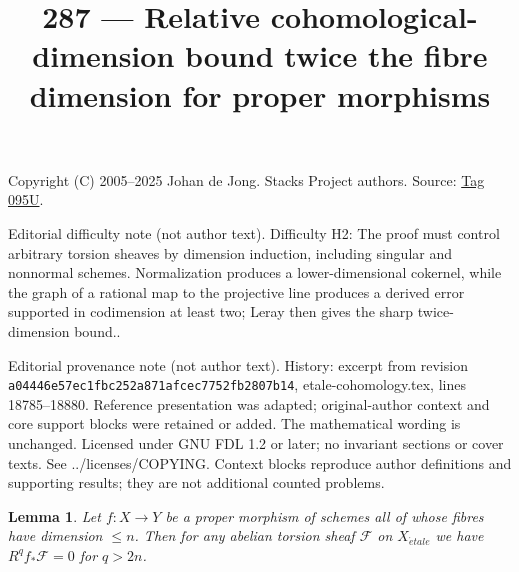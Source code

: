 \documentclass{amsart}
\theoremstyle{plain}
\newtheorem{lemma}[subsection]{Lemma}
\theoremstyle{definition}
\theoremstyle{remark}
\numberwithin{equation}{subsection}
\def\etale{{\acute{e}tale}}
\begin{document}
\title[Stacks Project, Tag 095U]{287 --- Relative cohomological-dimension bound twice the fibre dimension for proper morphisms}
\maketitle
\noindent Copyright (C) 2005--2025 Johan de Jong. Stacks Project authors. Source: \href{https://stacks.math.columbia.edu/tag/095U}{Tag 095U}.

\noindent Editorial difficulty note (not author text). Difficulty H2: The proof must control arbitrary torsion sheaves by dimension induction, including singular and nonnormal schemes. Normalization produces a lower-dimensional cokernel, while the graph of a rational map to the projective line produces a derived error supported in codimension at least two; Leray then gives the sharp twice-dimension bound..

\noindent Editorial provenance note (not author text). History: excerpt from revision \texttt{a0444\allowbreak 6e57e\allowbreak c1fbc\allowbreak 252a8\allowbreak 71afc\allowbreak ec775\allowbreak 2fb28\allowbreak 07b14}, etale-cohomology.tex, lines 18785--18880. Reference presentation was adapted; original-author context and core support blocks were retained or added. The mathematical wording is unchanged. Licensed under GNU FDL 1.2 or later; no invariant sections or cover texts. See ../licenses/COPYING. Context blocks reproduce author definitions and supporting results; they are not additional counted problems.

\begin{lemma}
\label{lemma-cohomological-dimension-proper}
Let $f : X \to Y$ be a proper morphism of schemes
all of whose fibres have dimension $\leq n$.
Then for any abelian torsion sheaf $\mathcal{F}$ on $X_\etale$
we have $R^qf_*\mathcal{F} = 0$ for $q > 2n$.
\end{lemma}
\end{document}
